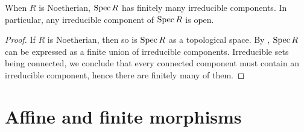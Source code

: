 \documentclass[a4paper,parskip=half,numbers=enddot, DIV=12]{scrreprt}
\begin{document}
\begin{lem}
	When $R$ is Noetherian, $\operatorname{Spec} R$ has finitely many irreducible components. In particular, any irreducible component of $\operatorname{Spec} R$ is open.
\end{lem}
\begin{proof}
	If $R$ is Noetherian, then so is $\operatorname{Spec} R$ as a topological space. By \cite[Proposition~2.1.1]{alg1}, $\operatorname{Spec} R$ can be expressed as a finite union of irreducible components. Irreducible sets being connected, we conclude that every connected component must contain an irreducible component, hence there are finitely many of them.
\end{proof}

\section{Affine and finite morphisms}
\end{document}
